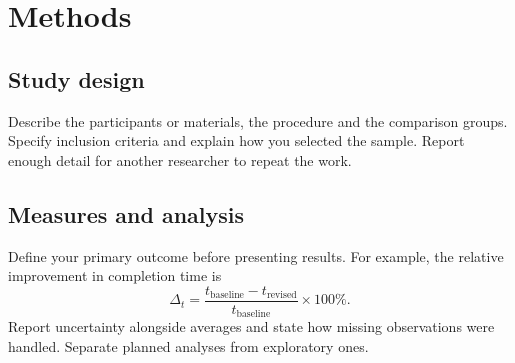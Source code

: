 \section{Methods}
\subsection{Study design}
Describe the participants or materials, the procedure and the comparison groups.
Specify inclusion criteria and explain how you selected the sample. Report enough
detail for another researcher to repeat the work.
\subsection{Measures and analysis}
Define your primary outcome before presenting results. For example, the relative
improvement in completion time is
\begin{equation}
\Delta_t = \frac{t_{\mathrm{baseline}}-t_{\mathrm{revised}}}{t_{\mathrm{baseline}}}\times100\%.
\label{eq:improvement}
\end{equation}
Report uncertainty alongside averages and state how missing observations were
handled. Separate planned analyses from exploratory ones.
